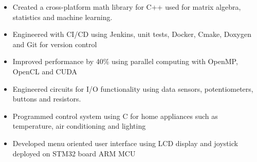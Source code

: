 \documentclass[11pt,a4paper,ragged2e]{altacv}
\begin{document}
\begin{paracol}{1}

\begin{itemize}
\item Created a cross-platform math library for C++ used for matrix algebra, statistics and machine learning.
\item Engineered with CI/CD using Jenkins, unit tests, Docker, Cmake, Doxygen and Git for version control
\item Improved performance by 40\% using parallel computing with OpenMP, OpenCL and CUDA
\end{itemize}

\tightdivider






\begin{itemize}
\item Engineered circuits for I/O functionality using data sensors, potentiometers, buttons and resistors.
\item Programmed control system using C for home appliances such as temperature, air conditioning and lighting 
\item Developed menu oriented user interface using LCD display and joystick deployed on STM32 board ARM MCU
\end{itemize}


\end{paracol}
\end{document}
